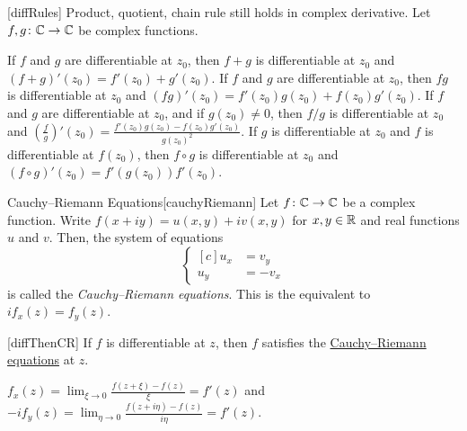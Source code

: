\documentclass[../complex_variables_1.tex]{subfiles}
\begin{document}
\begin{Theorem}{}[diffRules]
    Product, quotient, chain rule still holds in complex derivative.
    Let \(f, g \colon \CC \to \CC\) be complex functions.
    \begin{enumerate}[label=(\arabic*)]
        \ii
        If \(f\) and \(g\) are differentiable at \(z_0\), then \(f + g\) is differentiable at
        \(z_0\) and \((f+g)'(z_0) = f'(z_0) + g'(z_0)\).
        \ii
        If \(f\) and \(g\) are differentiable at \(z_0\), then \(fg\) is differentiable at
        \(z_0\) and \((fg)'(z_0) = f'(z_0)g(z_0) + f(z_0)g'(z_0)\).
        \ii
        If \(f\) and \(g\) are differentiable at \(z_0\), and if \(g(z_0) \neq 0\), then \(f/g\) is
        differentiable at \(z_0\) and \(\displaystyle \left( \frac{f}{g} \right)'(z_0) =
        \frac{f'(z_0)g(z_0)-f(z_0)g'(z_0)}{g(z_0)^2}\).
        \ii
        If \(g\) is differentiable at \(z_0\) and \(f\) is differentiable at \(f(z_0)\), then
        \(f \circ g\) is differentiable at \(z_0\) and \((f \circ g)'(z_0) = f'(g(z_0))f'(z_0)\).
    \end{enumerate}
\end{Theorem}

\begin{Definition}{Cauchy--Riemann Equations}[cauchyRiemann]
    Let \(f \colon \CC \to \CC\) be a complex function.
    Write \(f(x+iy) = u(x, y) + iv(x, y)\) for \(x, y \in \RR\) and real functions \(u\) and \(v\).
    Then, the system of equations
    \[
        \left\{\begin{aligned}[c]
                u_x &= v_y \\
                u_y &= -v_x
        \end{aligned}\right.
    \]
    is called the \emph{Cauchy--Riemann equations}.
    This is the equivalent to \(if_x(z) = f_y(z)\).
\end{Definition}

\begin{Theorem}{}[diffThenCR]
    If \(f\) is differentiable at \(z\), then \(f\)
    satisfies the \hyperlink{dfn:cauchyRiemann}{Cauchy--Riemann equations} at \(z\).
\end{Theorem}
\begin{myproof}[Proof]
    \(\displaystyle f_x(z) = \lim_{\xi \to 0} \frac{f(z + \xi) - f(z)}{\xi} = f'(z)\) and
    \(\displaystyle -if_y(z) = \lim_{\eta \to 0} \frac{f(z + i\eta) - f(z)}{i\eta} = f'(z)\).
\end{myproof}

\end{document}

